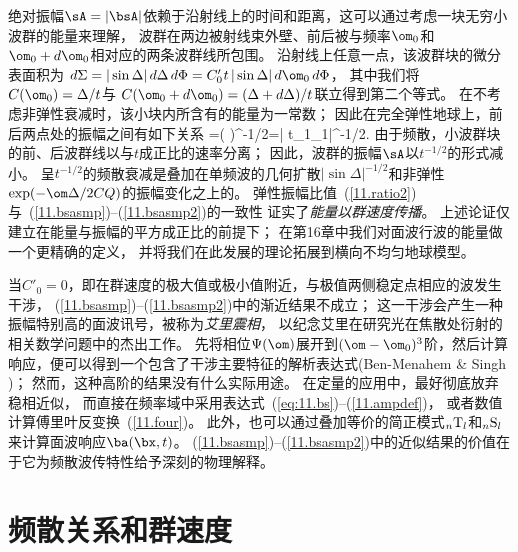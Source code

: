 绝对振幅$\sA=|\bsA|$依赖于沿射线上的时间和距离，这可以通过考虑一块无穷小波群的能量来理解，
波群在两边被射线束外壁、前后被与频率$\om_0$和$\om_0+d\om_0$相对应的两条波群线所包围。
沿射线上任意一点，该波群块的微分表面积为
$d\/\Sigma=|\sin\Delta|\,d\/\Delta\,d\/\Phi=C'_0\hspace{0.2 mm}t\,|\sin\Delta|\,d\om_0\,d\/\Phi$，
其中我们将$C(\om_0)=\Delta/t$与
$C(\om_0+d\om_0)=(\Delta+d\/\Delta)/t$联立得到第二个等式。
在不考虑非弹性衰减时，该小块内所含有的能量为一常数；
因此在完全弹性地球上，前后两点处的振幅之间有如下关系
\eq \label{11.ratio2}
=\left(
\right)^{-1/2}=\left|
{t_1\sin\Delta_1}\right|^{-1/2}.
\en
由于频散，小波群块的前、后波群线以与$t$成正比的速率分离；
因此，波群的振幅$\sA$以$t^{-1/2}$的形式减小。
呈$t^{-1/2}$的频散衰减是叠加在单频波的几何扩散$|\sin\Delta|^{-1/2}$和非弹性$\exp(-\om\Delta/2CQ)$的振幅变化之上的。 
弹性振幅比值~(\ref{11.ratio2})与~(\ref{11.bsasmp})--(\ref{11.bsasmp2})的一致性
证实了{\em 能量以群速度传播\/}。
上述论证仅建立在能量与振幅的平方成正比的前提下；
在第16章中我们对面波行波的能量做一个更精确的定义，
并将我们在此发展的理论拓展到横向不均匀地球模型。

当$C'_0=0$，即在群速度的极大值或极小值附近，与极值两侧稳定点相应的波发生干涉，
(\ref{11.bsasmp})--(\ref{11.bsasmp2})中的渐近结果不成立；
这一干涉会产生一种振幅特别高的面波讯号，被称为{\em 艾里震相\/}，
%
%
以纪念艾里在研究光在焦散处衍射的相关数学问题中的杰出工作。
先将相位$\Psi(\om)$展开到$(\om-\om_0)^3$阶，然后计算响应，便可以得到一个包含了干涉主要特征的解析表达式(Ben-Menahem \& Singh \citeyear{ben-menahem&singh81})；  然而，这种高阶的结果没有什么实际用途。
在定量的应用中，最好彻底放弃稳相近似，
而直接在频率域中采用表达式~(\ref{eq:11.bs})--(\ref{11.ampdef})，
或者数值计算傅里叶反变换~(\ref{11.four})。
此外，也可以通过叠加等价的简正模式${}_n{\rm T}_l$和${}_n{\rm S}_l$来计算面波响应$\ba(\bx,t)$。
(\ref{11.bsasmp})--(\ref{11.bsasmp2})中的近似结果的价值在于它为频散波传特性给予深刻的物理解释。
%

\section{频散关系和群速度}
%
%
%
\label{11.sec.disper}

